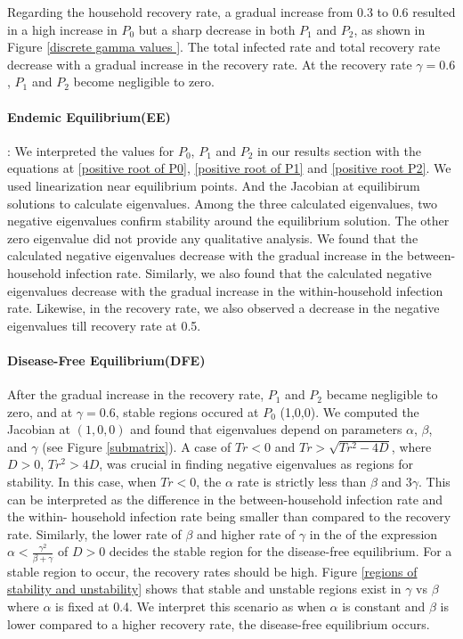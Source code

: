\documentclass[paper=a4, fontsize=11pt, twoside, BCOR=12mm, parskip=full, listof=totoc]{scrreprt}
\begin{document}
{Regarding the household recovery rate, a gradual increase from 0.3 to 0.6 resulted in a high increase in \(P_0\) but a sharp decrease in both \(P_1\) and \(P_2\), as shown in Figure \ref{discrete gamma values }. The total infected rate and total recovery rate decrease with a gradual increase in the recovery rate. At the recovery rate \(\gamma = 0.6\), \(P_1\) and \(P_2\) become negligible to zero.

\paragraph*{Endemic Equilibrium(EE)}:
We interpreted the values for $P_0$, $P_1$ and $P_2$ in our results section with the equations at \ref{positive root of P0}, \ref{positive root of P1} and \ref{positive root P2}. 
We used linearization near equilibrium points. And the Jacobian at equilibirum solutions to calculate eigenvalues. Among the three calculated eigenvalues, two negative eigenvalues confirm stability around the equilibrium solution. The other zero eigenvalue did not provide any qualitative analysis. We found that the calculated negative eigenvalues decrease with the gradual increase in the between-household infection rate. Similarly, we also found that the calculated negative eigenvalues decrease with the gradual increase in the within-household infection rate. Likewise, in the recovery rate, we also observed a decrease in the negative eigenvalues till recovery rate at 0.5. 

\paragraph*{Disease-Free Equilibrium(DFE)}
After the gradual increase in the recovery rate, $P_1$ and $P_2$ became negligible to zero, and at $\gamma=0.6$, stable regions occured at $P_0$ (1,0,0).
We computed the Jacobian at $(1,0,0)$ and found that eigenvalues depend on parameters $\alpha$, $\beta$, and $\gamma$ (see Figure \ref{submatrix}). A case of $Tr < 0$ and $Tr > \sqrt{Tr^2-4D}$, where $D > 0$, $Tr^2 > 4D$, was crucial in finding negative eigenvalues as regions for stability. In this case, when $Tr < 0$, the $\alpha$ rate is strictly less than $\beta$ and $3\gamma$. This can be interpreted as the difference in the between-household infection rate and the within- household infection rate being smaller than compared to the recovery rate. Similarly, the lower rate of $\beta$ and higher rate of $\gamma$ in the of the expression $\alpha < \frac{\gamma^2}{\beta + \gamma}$ of $D > 0$ decides the stable region for the disease-free equilibrium. For a stable region to occur, the recovery rates should be high. Figure \ref{regions of stability and unstability} shows that stable and unstable regions exist in $\gamma$ vs $\beta$ where $\alpha$ is fixed at 0.4. We interpret this scenario as when $\alpha$ is constant and $\beta$ is lower compared to a higher recovery rate, the disease-free equilibrium occurs.

}
\end{document}
